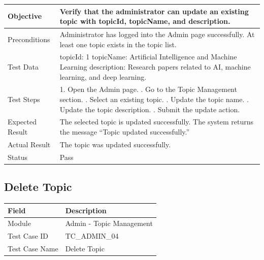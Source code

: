 \documentclass[12pt,a4paper]{article}
\begin{document}
{{\begin{longtable}{|p{4cm}|p{10cm}|}
	Objective &
	Verify that the administrator can update an existing topic with topicId, topicName, and description. \\ \hline
	
	Preconditions &
	Administrator has logged into the Admin page successfully. \newline
	At least one topic exists in the topic list.
	\\ \hline
	
	Test Data &
	topicId: 1 \newline
	topicName: Artificial Intelligence and Machine Learning \newline
	description: Research papers related to AI, machine learning, and deep learning.
	\\ \hline
	
	Test Steps &
	1. Open the Admin page. \newline
	2. Go to the Topic Management section. \newline
	3. Select an existing topic. \newline
	4. Update the topic name. \newline
	5. Update the topic description. \newline
	6. Submit the update action.
	\\ \hline
	
	Expected Result &
	The selected topic is updated successfully. The system returns the message ``Topic updated successfully.'' \\ \hline
	
	Actual Result &
	The topic was updated successfully. \\ \hline
	
	Status & Pass \\ \hline
	
\end{longtable}
\subsection{Delete Topic}
\begin{longtable}{|p{4cm}|p{10cm}|}
	\hline
	\textbf{Field} & \textbf{Description} \\ \hline
	
	Module & Admin - Topic Management \\ \hline
	
	Test Case ID & TC\_ADMIN\_04 \\ \hline
	
	Test Case Name & Delete Topic \\ \hline
	

\end{longtable}}}
\end{document}
